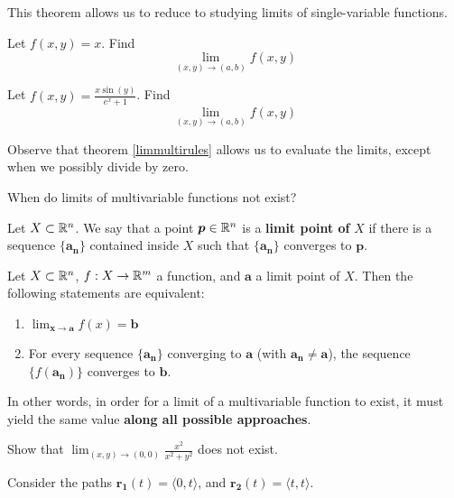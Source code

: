 This theorem allows us to reduce to studying limits of single-variable functions.
    
    \begin{example}
Let $f(x,y) = x$.  Find $$\lim_{(x,y) \to (a,b)}f(x,y)$$
\end{example}    


\begin{example}
Let $f(x,y) = \frac{x\sin(y)}{e^x+1}$.  Find $$\lim_{(x,y) \to (a,b)}f(x,y)$$
\end{example}  
    
    Observe that theorem \ref{limmultirules} allows us to evaluate the limits, except when we possibly divide by zero.
    
  \begin{motivating}
  When do limits of multivariable functions not exist?
  \end{motivating}  
    
    \begin{definition}
    Let $X \subset \mathbb{R}^n$.  We say that a point $\bm{p} \in \mathbb{R}^n$ is a \textbf{limit point of} $X$ if there is a sequence $\{\bm{a_n}\}$ contained inside $X$ such that $\{\bm{a_n}\}$ converges to $\bm{p}$.    
    \end{definition}
        
    
    \begin{theorem}
     Let $X \subset \mathbb{R}^n$, $f : X \to \mathbb{R}^m$ a function, and $\bm{a}$ a limit point of $X$.  Then the following statements are equivalent:
     
     \begin{enumerate}
         \item $\lim_{\bm{x} \to \bm{a}}f(x) = \bm{b}$
         \item For every sequence $\{\bm{a_n}\}$ converging to $\bm{a}$ (with $\bm{a_n} \neq \bm{a}$), the sequence $\{f(\bm{a_n})\}$ converges to $\bm{b}$.
     \end{enumerate}
     
    \end{theorem}
    
    In other words, in order for a limit of a multivariable function to exist, it must yield the same value \textbf{along all possible approaches}.
    
    \begin{example}
    Show that $\lim_{(x,y) \to (0,0)} \frac{x^2}{x^2 + y^2}$ does not exist.
    
    Consider the paths $\bm{r_1}(t) = \langle 0, t \rangle$, and $\bm{r_2}(t) = \langle t, t \rangle$.
    \end{example}
    
